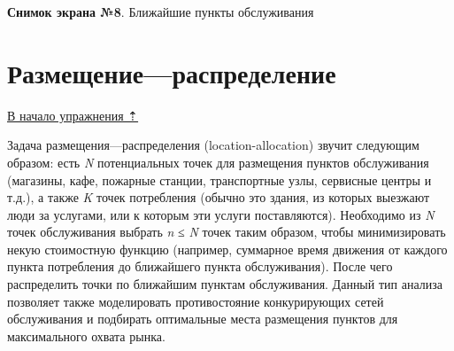 \documentclass[12pt,]{book}
\begin{document}
\textbf{Снимок экрана №8}. Ближайшие пункты обслуживания

\hypertarget{network-analysis-allocation}{%
\section{Размещение---распределение}\label{network-analysis-allocation}}

\protect\hyperlink{network-analysis}{В начало упражнения ⇡}

Задача размещения---распределения (location-allocation) звучит следующим образом: есть \emph{N} потенциальных точек для размещения пунктов обслуживания (магазины, кафе, пожарные станции, транспортные узлы, сервисные центры и т.д.), а также \emph{K} точек потребления (обычно это здания, из которых выезжают люди за услугами, или к которым эти услуги поставляются). Необходимо из \emph{N} точек обслуживания выбрать \emph{n} ≤ \emph{N} точек таким образом, чтобы минимизировать некую стоимостную функцию (например, суммарное время движения от каждого пункта потребления до ближайшего пункта обслуживания). После чего распределить точки по ближайшим пунктам обслуживания. Данный тип анализа позволяет также моделировать противостояние конкурирующих сетей обслуживания и подбирать оптимальные места размещения пунктов для максимального охвата рынка.
\end{document}
